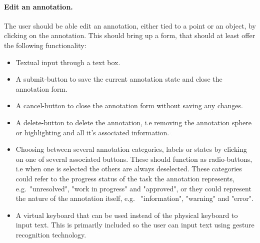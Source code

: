 \paragraph{Edit an annotation.} The user should be able edit an annotation, either tied to a point or an object, by clicking on the annotation. 
This should bring up a form, that should at least offer the following functionality:
\begin{itemize}
	\item Textual input through a text box.
	\item A submit-button to save the current annotation state and close the annotation form.
	\item A cancel-button to close the annotation form without saving any changes.
	\item A delete-button to delete the annotation, i.e removing the annotation sphere or highlighting and all it's associated information. 
	\item Choosing between several annotation categories, labels or states by clicking on one of several associated buttons. 
			These should function as radio-buttons, i.e when one is selected the others are always deselected.
			These categories could refer to the progress status of the task the annotation represents, e.g.~"unresolved", "work in progress" and "approved",
			or they could represent the nature of the annotation itself, e.g.~ "information", "warning" and "error".

	\item A virtual keyboard that can be used instead of the physical keyboard to input text. This is primarily included so the user can input text using 
			gesture recognition technology.
\end{itemize}

